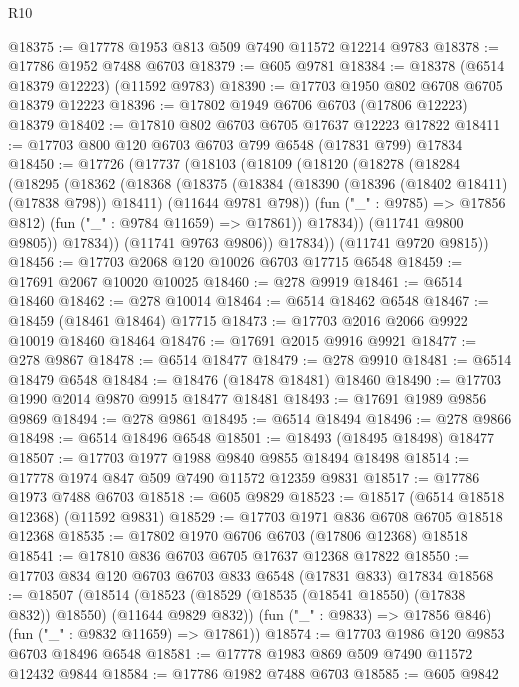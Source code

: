 \begin{lexlean}{R10}
\begin{coremodule}
@18375 := @17778 @1953 @813 @509 @7490 @11572 @12214 @9783
@18378 := @17786 @1952 @7488 @6703
@18379 := @605 @9781
@18384 := @18378 (@6514 @18379 @12223) (@11592 @9783)
@18390 := @17703 @1950 @802 @6708 @6705 @18379 @12223
@18396 := @17802 @1949 @6706 @6703 (@17806 @12223) @18379
@18402 := @17810 @802 @6703 @6705 @17637 @12223 @17822
@18411 := @17703 @800 @120 @6703 @6703 @799 @6548 (@17831 @799) @17834
@18450 := @17726
    (@17737
      (@18103
        (@18109
          (@18120
            (@18278
              (@18284
                (@18295
                  (@18362
                    (@18368
                      (@18375
                        (@18384
                          (@18390 (@18396 (@18402 @18411) (@17838 @798)) @18411)
                          (@11644 @9781 @798))
                        (fun ("_" : @9785) => @17856 @812)
                        (fun ("_" : @9784 @11659) => @17861))
                      @17834))
                  (@11741 @9800 @9805))
                @17834))
            (@11741 @9763 @9806))
          @17834))
      (@11741 @9720 @9815))
@18456 := @17703 @2068 @120 @10026 @6703 @17715 @6548
@18459 := @17691 @2067 @10020 @10025
@18460 := @278 @9919
@18461 := @6514 @18460
@18462 := @278 @10014
@18464 := @6514 @18462 @6548
@18467 := @18459 (@18461 @18464) @17715
@18473 := @17703 @2016 @2066 @9922 @10019 @18460 @18464
@18476 := @17691 @2015 @9916 @9921
@18477 := @278 @9867
@18478 := @6514 @18477
@18479 := @278 @9910
@18481 := @6514 @18479 @6548
@18484 := @18476 (@18478 @18481) @18460
@18490 := @17703 @1990 @2014 @9870 @9915 @18477 @18481
@18493 := @17691 @1989 @9856 @9869
@18494 := @278 @9861
@18495 := @6514 @18494
@18496 := @278 @9866
@18498 := @6514 @18496 @6548
@18501 := @18493 (@18495 @18498) @18477
@18507 := @17703 @1977 @1988 @9840 @9855 @18494 @18498
@18514 := @17778 @1974 @847 @509 @7490 @11572 @12359 @9831
@18517 := @17786 @1973 @7488 @6703
@18518 := @605 @9829
@18523 := @18517 (@6514 @18518 @12368) (@11592 @9831)
@18529 := @17703 @1971 @836 @6708 @6705 @18518 @12368
@18535 := @17802 @1970 @6706 @6703 (@17806 @12368) @18518
@18541 := @17810 @836 @6703 @6705 @17637 @12368 @17822
@18550 := @17703 @834 @120 @6703 @6703 @833 @6548 (@17831 @833) @17834
@18568 := @18507
    (@18514
      (@18523 (@18529 (@18535 (@18541 @18550) (@17838 @832)) @18550) (@11644 @9829 @832))
      (fun ("_" : @9833) => @17856 @846)
      (fun ("_" : @9832 @11659) => @17861))
@18574 := @17703 @1986 @120 @9853 @6703 @18496 @6548
@18581 := @17778 @1983 @869 @509 @7490 @11572 @12432 @9844
@18584 := @17786 @1982 @7488 @6703
@18585 := @605 @9842

\end{coremodule}
\end{lexlean}
